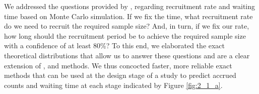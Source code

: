 We addressed the questions provided by \cite{carter2004application}, regarding recruitment rate and waiting time based on Monte Carlo simulation. If we fix the time, what recruitment rate do we need to recruit the required sample size? And, in turn, if we fix our rate, how long should the recruitment period be to achieve the required sample size with a confidence of at least 80\%? To this end, we elaborated the exact theoretical distributions that allow us to answer these questions and are a clear extension of \cite{carter2004application}, and \cite{bagiella2001predicting} methods. We thus concocted faster, more reliable exact methods that can be used at the design stage of a study to predict accrued counts and waiting time at each stage indicated by Figure \ref{fig:2_1_a}.
% 
